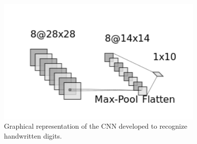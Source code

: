 \begin{figure}[htb]
\centering
\includegraphics[width=0.9\textwidth]{figures/cnn_2d}
\caption{Graphical representation of the CNN developed to recognize handwritten digits.}
\label{fig:cnn2d}
\end{figure}

